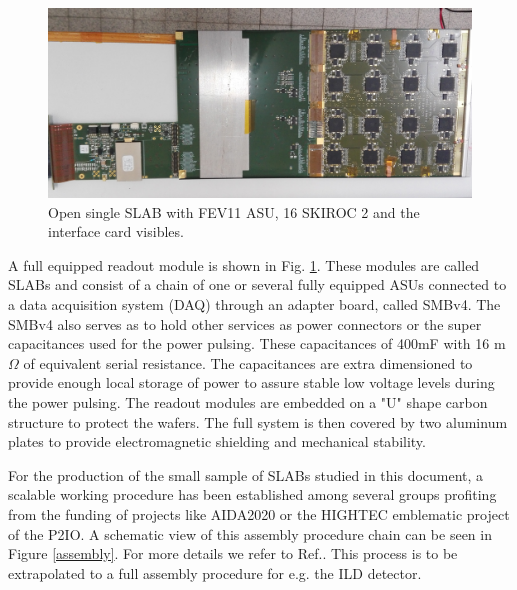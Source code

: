 \documentclass[a4paper,11pt]{article}
\begin{document}
\begin{figure}[!ht]
  \centering
    \includegraphics[width=6in]{../figs/short_slab_bga.jpg} 
  \caption{Open single SLAB with FEV11 ASU, 16 SKIROC 2 and the interface card visibles. }
\label{ASU2}
\end{figure}

A full equipped readout module is shown in Fig. \ref{ASU2}. These modules are called
SLABs and consist of a chain of one or several fully equipped ASUs
connected to a data acquisition system (DAQ) through an adapter board, called SMBv4.
The SMBv4 also serves as to hold other
services as power connectors or the super capacitances used for the power pulsing. 
These capacitances of 400mF with 16 m$\Omega$ of equivalent serial resistance. 
The capacitances are extra dimensioned to provide enough local storage 
of power to assure stable low voltage levels during the power pulsing. %
The readout modules are embedded on a "U" shape carbon structure to protect the wafers.
The full system is then covered by two aluminum plates
to provide electromagnetic shielding and mechanical stability.

For the production of the small sample of SLABs studied in this document,
a scalable working procedure has been established among several groups \cite{Boudry:2318814}
profiting from the funding of projects like AIDA2020 or the HIGHTEC emblematic project
of the P2IO. A schematic view of this assembly procedure chain can be seen in
Figure \ref{assembly}. For more details we refer to Ref.\cite{Boudry:2318814}.
This process is to be extrapolated to a full assembly procedure for
e.g. the ILD detector.
\end{document}
